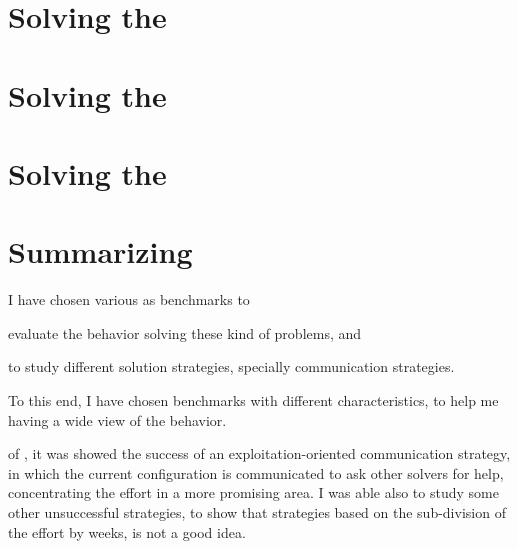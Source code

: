 
\section{Solving the \sgp}
\label{sec:golfers}



\section{Solving the \carrp}
\label{sec:costas}



\section{Solving the \grp}
\label{sec:golomb}



\section{Summarizing}

 I have chosen various \CSPs{} as benchmarks to \begin{inparaenum}[1.] \item evaluate the \posl{} behavior solving these kind of problems, and \item to study different solution strategies, specially communication strategies.\end{inparaenum} To this end, I have chosen benchmarks with different characteristics, to help me having a wide view of the \posl{} behavior.

 of \sgp{}, it was showed the success of an exploitation-oriented communication strategy, in which the current configuration is communicated to ask other solvers for help, concentrating the effort in a more promising area. I was able also to study some other unsuccessful strategies, to show that strategies based on the sub-division of the effort by weeks, is not a good idea.




